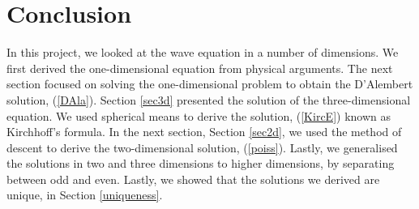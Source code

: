 \documentclass[a4paper, 12pt]{article}
\numberwithin{equation}{section}
\begin{document}
\section{Conclusion}

In this project, we looked at the wave equation  in a number of dimensions. We
first derived the one-dimensional equation from physical arguments. The next
section focused on solving the one-dimensional problem to obtain the D'Alembert
solution, (\ref{DAla}). Section \ref{sec3d} presented the solution of the three-dimensional equation. We
used spherical means to derive the solution, (\ref{KircE}) known as Kirchhoff's
formula. In the next section, Section \ref{sec2d}, we used the method of descent to
derive the two-dimensional solution, (\ref{poiss}). Lastly, we generalised the
solutions in two and three dimensions to higher dimensions, by separating
between odd and even. Lastly, we showed that the solutions we derived are
unique, in Section \ref{uniqueness}.

\newpage 



\end{document}

